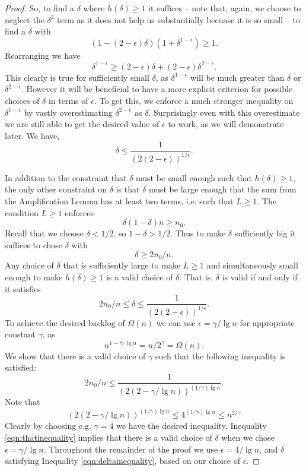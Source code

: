 \documentclass[twocolumn]{article}[11pt]
\begin{document}
\begin{proof}
  So, to find a $\delta$ where $h(\delta) \ge 1$ it suffices -- note that, again, we choose
  to neglect the $\delta^2$ term as it does not help us substantially becuase
  it is so small -- to find a $\delta$ with 
  $$(1-(2-\epsilon)\delta)(1+\delta^{1-\epsilon}) \ge 1.$$
  Rearranging we have 
  $$\delta^{1-\epsilon} \ge (2-\epsilon)\delta + (2-\epsilon)\delta^{2-\epsilon}.$$
  This clearly is true for sufficiently small $\delta$, as
  $\delta^{1-\epsilon}$ will be much greater than $\delta$ or
  $\delta^{2-\epsilon}$.
  However it will be beneficial to have a more explicit criterion for possible
  choices of $\delta$ in terms of $\epsilon$. To get this, we enforce a much
  stronger inequality on $\delta^{1-\epsilon}$ by vastly overestimating
  $\delta^{2-\epsilon}$ as $\delta$. Surprisingly even with this overestimate
  we are still able to get the desired value of $\epsilon$ to work, as we will demonstrate later.
  We have,
  $$\delta \le \frac{1}{(2(2-\epsilon))^{1/\epsilon}}.$$

  In addition to the constraint that $\delta$ must be small enough such that
  $h(\delta) \ge 1$, the only other constraint on $\delta$ is that $\delta$
  must be large enough that the sum from the Amplification Lemma has at least two terms, i.e. such that $L \ge 1$.
  The condition $L \ge 1$ enforces 
  $$\delta(1-\delta)n \ge n_0. $$
  Recall that we choose $\delta < 1/2$, so $1-\delta > 1/2$. Thus to make
  $\delta$ sufficiently big it suffices to chose $\delta$ with 
  $$\delta \ge 2n_0/n.$$
  Any choice of $\delta$ that is sufficiently large to make $L \ge 1$ and
  simultaneously small enough to make $h(\delta) \ge 1$ is a valid choice of
  $\delta$. That is, $\delta$ is valid if and only if it satisfies
  \begin{equation}
    \label{eqn:deltainequality}
       2n_0/n \le \delta \le  \frac{1}{(2(2-\epsilon))^{1/\epsilon}}.
  \end{equation}
  To achieve the desired backlog of $\Omega(n)$ we can use $\epsilon =
  \gamma/\lg n$ for appropriate constant $\gamma$, as $$n^{1-\gamma/\lg n} =
  n/2^\gamma = \Omega(n).$$
  We show that there is a valid choice of $\gamma$ such that the following inequality is satisfied:
  \begin{equation}
    \label{eqn:thatinequality}
   2n_0/n \le \frac{1}{(2(2-\gamma/\lg n))^{(1/\gamma)\lg n}}.
  \end{equation}
  Note that 
  $$(2(2-\gamma/\lg n))^{(1/\gamma)\lg n} \le 4^{(1/\gamma)\lg n} \le n^{2/\gamma}$$
  Clearly by choosing e.g. $\gamma = 4$ we have the desired inequality.
  Inequality \ref{eqn:thatinequality} implies that there is a valid choice of
  $\delta$ when we chose $\epsilon = \gamma / \lg n$. Throughout the remainder
  of the proof we use $\epsilon = 4 / \lg n$, and $\delta$ satisfying
  Inequality \ref{eqn:deltainequality}, based on our choice of $\epsilon$. 


\end{proof}
\end{document}
